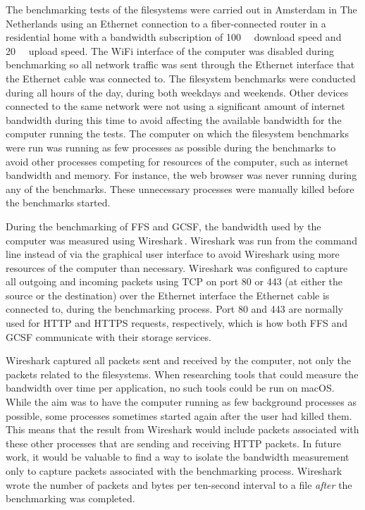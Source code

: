 The benchmarking tests of the filesystems were carried out in Amsterdam in The Netherlands using an Ethernet connection to a \mbox{fiber-connected} router in a residential home with a bandwidth subscription of \SI{100}{\mega\bit} download speed and \SI{20}{\mega\bit} upload speed. The WiFi interface of the computer was disabled during benchmarking so all network traffic was sent through the Ethernet interface that the Ethernet cable was connected to. The filesystem benchmarks were conducted during all hours of the day, during both weekdays and weekends. Other devices connected to the same network were not using a significant amount of internet bandwidth during this time to avoid affecting the available bandwidth for the computer running the tests. The computer on which the filesystem benchmarks were run was running as few processes as possible during the benchmarks to avoid other processes competing for resources of the computer, such as internet bandwidth and memory. For instance, the web browser was never running during any of the benchmarks. These unnecessary processes were manually killed before the benchmarks started.

During the benchmarking of \gls{FFS} and \gls{GCSF}, the bandwidth used by the computer was measured using Wireshark\,\cite{WiresharkGoDeep}. Wireshark was run from the command line instead of via the graphical user interface to avoid Wireshark using more resources of the computer than necessary. Wireshark was configured to capture all outgoing and incoming packets using TCP on port 80 or 443 (at either the source or the destination) over the Ethernet interface the Ethernet cable is connected to, during the benchmarking process. Port 80 and 443 are normally used for HTTP and HTTPS requests, respectively, which is how both \gls{FFS} and \gls{GCSF} communicate with their storage services. 

Wireshark captured all packets sent and received by the computer, not only the packets related to the filesystems. When researching tools that could measure the bandwidth over time per application, no such tools could be run on macOS. While the aim was to have the computer running as few background processes as possible, some processes sometimes started again after the user had killed them. This means that the result from Wireshark would include packets associated with these other processes that are sending and receiving HTTP packets. In future work, it would be valuable to find a way to isolate the bandwidth measurement only to capture packets associated with the benchmarking process. Wireshark wrote the number of packets and bytes per ten-second interval to a file \textit{after} the benchmarking was completed. 

